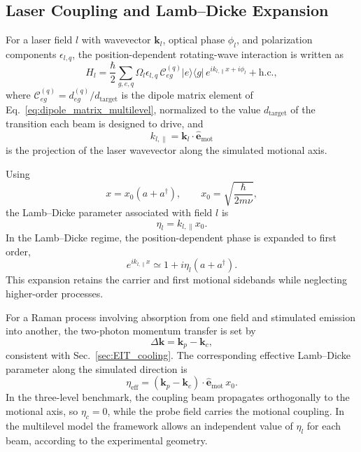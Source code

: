 \subsection{Laser Coupling and Lamb--Dicke Expansion}
\label{subsec:laser_coupling}

For a laser field $l$ with wavevector $\mathbf{k}_l$, optical phase $\phi_l$, and polarization components $\epsilon_{l,q}$, the position-dependent rotating-wave interaction is written as
\begin{equation}
    H_l
    =
    \frac{\hbar}{2}
    \sum_{g,e,q}
    \Omega_l\epsilon_{l,q}\,
    \mathcal C_{eg}^{(q)}
    |e\rangle\langle g|\,
    e^{i k_{l,\parallel}x+i\phi_l}
    +
    \mathrm{h.c.},
    \label{eq:general_laser_interaction}
\end{equation}
where $\mathcal C_{eg}^{(q)}=d_{eg}^{(q)}/d_{\mathrm{target}}$ is the dipole matrix element of Eq.~\eqref{eq:dipole_matrix_multilevel}, normalized to the value $d_{\mathrm{target}}$ of the transition each beam is designed to drive, and
\begin{equation}
    k_{l,\parallel}
    =
    \mathbf{k}_l\cdot\hat{\mathbf e}_{\mathrm{mot}}
\end{equation}
is the projection of the laser wavevector along the simulated motional axis.

Using
\begin{equation}
    x=x_0(a+a^\dagger),
    \qquad
    x_0=\sqrt{\frac{\hbar}{2m\nu}},
\end{equation}
the Lamb--Dicke parameter associated with field $l$ is
\begin{equation}
    \eta_l=k_{l,\parallel}x_0.
    \label{eq:eta_individual_beam}
\end{equation}
In the Lamb--Dicke regime, the position-dependent phase is expanded to first order,
\begin{equation}
    e^{ik_{l,\parallel}x}
    \simeq
    1+i\eta_l(a+a^\dagger).
    \label{eq:LD_expansion_numerical}
\end{equation}
This expansion retains the carrier and first motional sidebands while neglecting higher-order processes.

For a Raman process involving absorption from one field and stimulated emission into another, the two-photon momentum transfer is set by
\begin{equation}
    \Delta\mathbf{k}
    =
    \mathbf{k}_p-\mathbf{k}_c,
\end{equation}
consistent with Sec.~\ref{sec:EIT_cooling}. The corresponding effective Lamb--Dicke parameter along the simulated direction is
\begin{equation}
    \eta_{\mathrm{eff}}
    =
    (\mathbf{k}_p-\mathbf{k}_c)\cdot
    \hat{\mathbf e}_{\mathrm{mot}}\,x_0.
    \label{eq:eta_effective_numerical}
\end{equation}
In the three-level benchmark, the coupling beam propagates orthogonally to the motional axis, so $\eta_c=0$, while the probe field carries the motional coupling. In the multilevel model the framework allows an independent value of $\eta_l$ for each beam, according to the experimental geometry.

